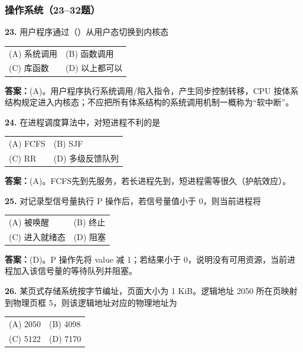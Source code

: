 \subsubsection*{操作系统（23--32题）}

\noindent\textbf{23.} 用户程序通过（\quad）从用户态切换到内核态
\begin{center}
\begin{tabular}{ll}
(A) 系统调用 & (B) 函数调用 \\[6pt]
(C) 库函数 & (D) 以上都可以
\end{tabular}
\end{center}

\ifshowsolutions\par\noindent\textbf{答案：}(A)。用户程序执行系统调用/陷入指令，产生同步控制转移，CPU 按体系结构规定进入内核态；不应把所有体系结构的系统调用机制一概称为“软中断”。\else \answerarea \fi

\vspace{6pt}

\noindent\textbf{24.} 在进程调度算法中，对短进程不利的是
\begin{center}
\begin{tabular}{ll}
(A) FCFS & (B) SJF \\[6pt]
(C) RR & (D) 多级反馈队列
\end{tabular}
\end{center}

\ifshowsolutions\par\noindent\textbf{答案：}(A)。FCFS先到先服务，若长进程先到，短进程需等很久（护航效应）。\else \answerarea \fi

\vspace{6pt}

\noindent\textbf{25.} 对记录型信号量执行 P 操作后，若信号量值小于 0，则当前进程将
\begin{center}
\begin{tabular}{ll}
(A) 被唤醒 & (B) 终止 \\[6pt]
(C) 进入就绪态 & (D) 阻塞
\end{tabular}
\end{center}

\ifshowsolutions\par\noindent\textbf{答案：}(D)。P 操作先将 value 减 1；若结果小于 0，说明没有可用资源，当前进程加入该信号量的等待队列并阻塞。\else \answerarea \fi

\vspace{6pt}

\noindent\textbf{26.} 某页式存储系统按字节编址，页面大小为 1 KiB。逻辑地址 2050 所在页映射到物理页框 5，则该逻辑地址对应的物理地址为
\begin{center}
\begin{tabular}{ll}
(A) 2050 & (B) 4098 \\[6pt]
(C) 5122 & (D) 7170
\end{tabular}
\end{center}

